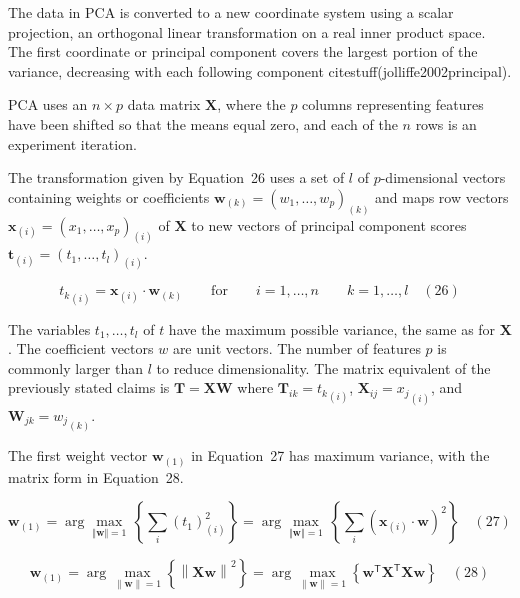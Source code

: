 \documentclass[preprint,12pt]{elsarticle}
\begin{document}
The data in PCA is converted to a new coordinate system using a scalar projection, an orthogonal linear transformation on a real inner product space. The first coordinate or principal component covers the largest portion of the variance, decreasing with each following component citestuff(jolliffe2002principal).

PCA uses an $n\times p$ data matrix $\mathbf{X}$, where the $p$ columns representing features have been shifted so that the means equal zero, and each of the $n$ rows is an experiment iteration.

The transformation given by Equation~26 uses a set of $l$ of $p$-dimensional vectors containing weights or coefficients $\mathbf{w}_{\left(k\right)}=(w_{1},\dots ,w_{p})_{\left(k\right)}$ and maps row vectors $\mathbf{x}_{\left(i\right)}=(x_{1},\dots ,x_{p})_{\left(i\right)}$ of $\mathbf{X}$ to new vectors of principal component scores $\mathbf{t}_{\left(i\right)}=(t_{1},\dots ,t_{l})_{\left(i\right)}$.

\begin{equation}
	{t_{k}}_{\left(i\right)}=\mathbf{x}_{\left(i\right)}\cdot \mathbf{w}_{\left(k\right)}\qquad \mathrm{for} \qquad i=1,\dots,n \qquad k=1,\dots ,l
	\quad\left(26\right)
\end{equation}

The variables $t_{1},\dots ,t_{l}$ of $t$ have the maximum possible variance, the same as for $\mathbf{X}$. The coefficient vectors $w$ are unit vectors. The number of features $p$ is commonly larger than $l$ to reduce dimensionality. The matrix equivalent of the previously stated claims is $\mathbf{T}=\mathbf{X} \mathbf{W}$ where ${\mathbf{T}}_{ik}={t_{k}}_{\left(i\right)}$, ${\mathbf{X}}_{ij}={x_{j}}_{\left(i\right)}$, and ${\mathbf{W}}_{jk}={w_{j}}_{\left(k\right)}$.

The first weight vector $\mathbf{w}_{\left(1\right)}$ in Equation~27 has maximum variance, with the matrix form in Equation~28.

\begin{equation}
	\mathbf{w}_{\left(1\right)}=\arg \max_{\Vert \mathbf{w} \Vert =1}\,\left\{\sum_{i}(t_{1})_{\left(i\right)}^{2}\right\}=\arg \max_{\Vert \mathbf{w} \Vert =1}\,\left\{\sum_{i}\left(\mathbf{x}_{\left(i\right)}\cdot \mathbf{w} \right)^{2}\right\}
	\quad\left(27\right)
\end{equation}

\begin{equation}
	\mathbf{w}_{\left(1\right)}=\arg \max_{\left\|\mathbf{w} \right\|=1}\left\{\left\|\mathbf{Xw} \right\|^{2}\right\}=\arg \max_{\left\|\mathbf{w} \right\|=1}\left\{\mathbf{w}^{\mathsf{T}}\mathbf{X}^{\mathsf{T}}\mathbf{Xw} \right\}
	\quad\left(28\right)
\end{equation}
\end{document}
